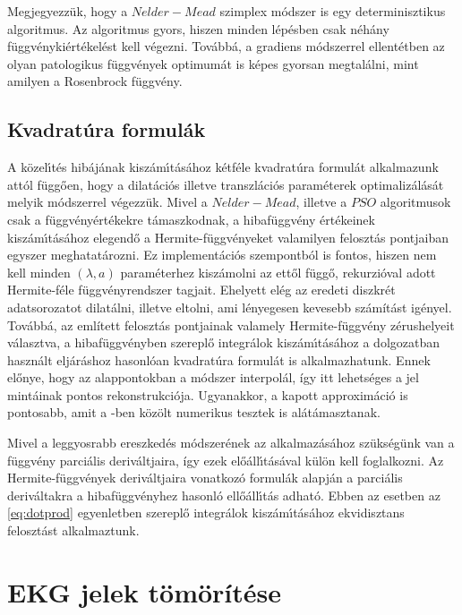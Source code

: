 \documentclass[oneside,titlepage,12pt,a4paper]{report}
\begin{document}
Megjegyezzük, hogy a $Nelder-Mead$ szimplex módszer is egy determinisztikus algoritmus. Az algoritmus gyors, hiszen minden lépésben csak néhány függvénykiértékelést kell végezni. Továbbá, a gradiens módszerrel ellentétben az olyan patologikus függvények optimumát is képes gyorsan megtalálni, mint amilyen a Rosenbrock függvény. 


\section{Kvadrat\'ura formul\'ak}
\label{sec:kvad}

A k\"ozel\'\i t\'es hib\'aj\'anak kisz\'am\'\i t\'as\'ahoz k\'etf\'ele kvadrat\'ura formul\'at alkalmazunk
att\'ol f\"ugg\H oen, hogy a dilat\'aci\'os illetve transzl\'aci\'os param\'eterek optimaliz\'al\'as\'at
melyik módszerrel v\'egezz\"uk. Mivel a $Nelder-Mead$, illetve a $PSO$ algoritmusok
csak a f\"uggv\'eny\'ert\'ekekre t\'amaszkodnak, a hibaf\"uggv\'eny \'ert\'ekeinek kisz\'am\'\i t\'as\'ahoz elegend\H o a Hermite-f\"uggv\'enyeket valamilyen feloszt\'as pontjaiban egyszer meghatat\'arozni. Ez implementációs szempontból is fontos, hiszen nem kell minden $(\lambda,a)$ paraméterhez kiszámolni az ettől függő, rekurzióval adott Hermite-féle függvényrendszer tagjait. Ehelyett elég az eredeti diszkrét adatsorozatot dilatálni, illetve eltolni, ami lényegesen kevesebb számítást igényel. Továbbá, az említett feloszt\'as pontjainak valamely Hermite-f\"uggv\'eny z\'erushelyeit v\'alasztva, a hibaf\"uggv\'eny\-ben  szerepl\H o integr\'alok kisz\'am\'\i t\'as\'ahoz
a \cite{waveletECG} dolgozatban haszn\'alt elj\'ar\'ashoz hasonl\'oan kvadrat\'ura formul\'at is alkalmazhatunk. Ennek előnye, hogy az alappontokban a módszer interpolál, így itt lehetséges a jel mintáinak pontos rekonstrukciója. Ugyanakkor, a kapott approximáció is pontosabb, amit a \cite{waveletECG}-ben közölt numerikus tesztek is alátámasztanak.
	\par Mivel a leggyosrabb ereszked\'es m\'odszer\'enek az alkalmaz\'as\'ahoz 
sz\"uks\'eg\"unk van a f\"uggv\'eny parci\'alis deriv\'altjaira, így ezek el\H o\'all\'\i t\'as\'aval
k\"ul\"on  kell foglalkozni. Az Hermite-f\"uggv\'enyek deriv\'altjaira vonatkoz\'o formul\'ak alapj\'an a
parci\'alis deriv\'altakra a hibaf\"uggv\'enyhez hasonl\'o ell\H o\'all\'\i t\'as adhat\'o. Ebben az esetben az \eqref{eq:dotprod} egyenletben szereplő integr\'alok kisz\'am\'\i t\'as\'ahoz ekvidisztans feloszt\'ast alkalmaztunk.

\chapter{EKG jelek tömörítése}
	
\end{document}
